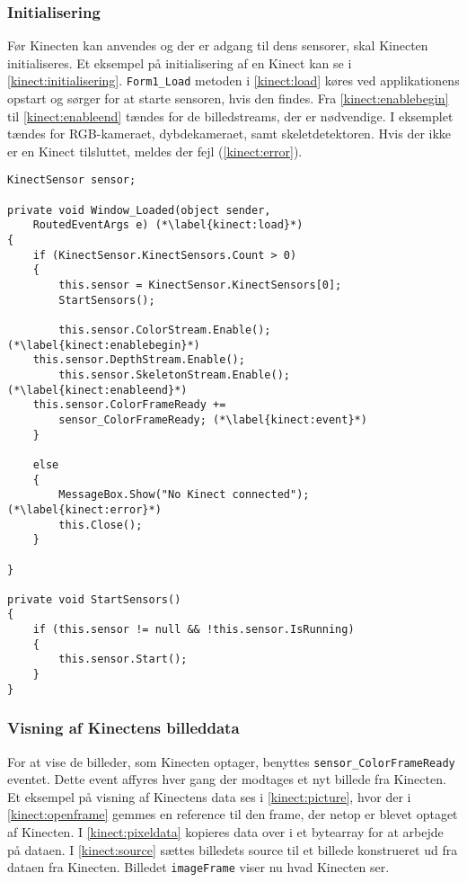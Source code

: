\subsubsection{Initialisering}
Før Kinecten kan anvendes og der er adgang til dens sensorer, skal Kinecten initialiseres.
Et eksempel på initialisering af en Kinect kan se i \cref{kinect:initialisering}. \lstinline[style=csharp]|Form1_Load| metoden i \cref{kinect:load} køres ved applikationens opstart og sørger for at starte sensoren, hvis den findes. Fra \cref{kinect:enablebegin} til \cref{kinect:enableend} tændes for de billedstreams, der er nødvendige. I eksemplet tændes for RGB-kameraet, dybdekameraet, samt skeletdetektoren. Hvis der ikke er en Kinect tilsluttet, meldes der fejl (\cref{kinect:error}).

\begin{lstlisting}[style=csharp, label=kinect:initialisering, caption={Initialisering af en Kinect sensor.}]
KinectSensor sensor;

private void Window_Loaded(object sender,
	RoutedEventArgs e) (*\label{kinect:load}*)
{
    if (KinectSensor.KinectSensors.Count > 0)
    {
        this.sensor = KinectSensor.KinectSensors[0];
        StartSensors();
        
        this.sensor.ColorStream.Enable();(*\label{kinect:enablebegin}*)    
	this.sensor.DepthStream.Enable();
        this.sensor.SkeletonStream.Enable();(*\label{kinect:enableend}*)
	this.sensor.ColorFrameReady += 
		sensor_ColorFrameReady; (*\label{kinect:event}*)
    }

    else
    {
        MessageBox.Show("No Kinect connected"); (*\label{kinect:error}*)
        this.Close();
    }

}

private void StartSensors()
{
    if (this.sensor != null && !this.sensor.IsRunning)
    {
        this.sensor.Start();
    }
}
\end{lstlisting}

\subsubsection{Visning af Kinectens billeddata}
For at vise de billeder, som Kinecten optager, benyttes \lstinline[style=csharp]!sensor_ColorFrameReady! eventet. 
Dette event affyres hver gang der modtages et nyt billede fra Kinecten. 
Et eksempel på visning af Kinectens data ses i \cref{kinect:picture}, hvor der i \cref{kinect:openframe} gemmes en reference til den frame, der netop er blevet optaget af Kinecten.
I \cref{kinect:pixeldata} kopieres data over i et bytearray for at arbejde på dataen. 
I \cref{kinect:source} sættes billedets source til et billede konstrueret ud fra dataen fra Kinecten.
Billedet \lstinline[style=csharp]|imageFrame| viser nu hvad Kinecten ser.

